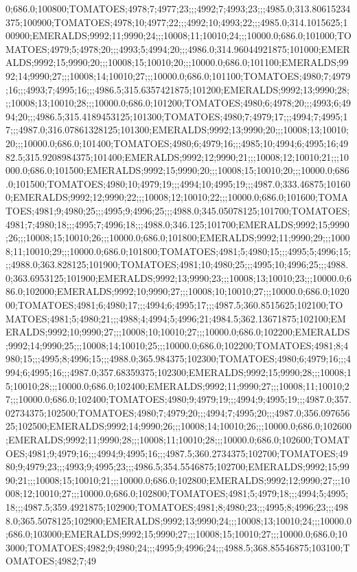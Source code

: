 0;686.0;100800;TOMATOES;4978;7;4977;23;;;4992;7;4993;23;;;4985.0;313.80615234375;100900;TOMATOES;4978;10;4977;22;;;4992;10;4993;22;;;4985.0;314.1015625;100900;EMERALDS;9992;11;9990;24;;;10008;11;10010;24;;;10000.0;686.0;101000;TOMATOES;4979;5;4978;20;;;4993;5;4994;20;;;4986.0;314.96044921875;101000;EMERALDS;9992;15;9990;20;;;10008;15;10010;20;;;10000.0;686.0;101100;EMERALDS;9992;14;9990;27;;;10008;14;10010;27;;;10000.0;686.0;101100;TOMATOES;4980;7;4979;16;;;4993;7;4995;16;;;4986.5;315.6357421875;101200;EMERALDS;9992;13;9990;28;;;10008;13;10010;28;;;10000.0;686.0;101200;TOMATOES;4980;6;4978;20;;;4993;6;4994;20;;;4986.5;315.4189453125;101300;TOMATOES;4980;7;4979;17;;;4994;7;4995;17;;;4987.0;316.07861328125;101300;EMERALDS;9992;13;9990;20;;;10008;13;10010;20;;;10000.0;686.0;101400;TOMATOES;4980;6;4979;16;;;4985;10;4994;6;4995;16;4982.5;315.9208984375;101400;EMERALDS;9992;12;9990;21;;;10008;12;10010;21;;;10000.0;686.0;101500;EMERALDS;9992;15;9990;20;;;10008;15;10010;20;;;10000.0;686.0;101500;TOMATOES;4980;10;4979;19;;;4994;10;4995;19;;;4987.0;333.46875;101600;EMERALDS;9992;12;9990;22;;;10008;12;10010;22;;;10000.0;686.0;101600;TOMATOES;4981;9;4980;25;;;4995;9;4996;25;;;4988.0;345.05078125;101700;TOMATOES;4981;7;4980;18;;;4995;7;4996;18;;;4988.0;346.125;101700;EMERALDS;9992;15;9990;26;;;10008;15;10010;26;;;10000.0;686.0;101800;EMERALDS;9992;11;9990;29;;;10008;11;10010;29;;;10000.0;686.0;101800;TOMATOES;4981;5;4980;15;;;4995;5;4996;15;;;4988.0;363.828125;101900;TOMATOES;4981;10;4980;25;;;4995;10;4996;25;;;4988.0;363.6953125;101900;EMERALDS;9992;13;9990;23;;;10008;13;10010;23;;;10000.0;686.0;102000;EMERALDS;9992;10;9990;27;;;10008;10;10010;27;;;10000.0;686.0;102000;TOMATOES;4981;6;4980;17;;;4994;6;4995;17;;;4987.5;360.8515625;102100;TOMATOES;4981;5;4980;21;;;4988;4;4994;5;4996;21;4984.5;362.13671875;102100;EMERALDS;9992;10;9990;27;;;10008;10;10010;27;;;10000.0;686.0;102200;EMERALDS;9992;14;9990;25;;;10008;14;10010;25;;;10000.0;686.0;102200;TOMATOES;4981;8;4980;15;;;4995;8;4996;15;;;4988.0;365.984375;102300;TOMATOES;4980;6;4979;16;;;4994;6;4995;16;;;4987.0;357.68359375;102300;EMERALDS;9992;15;9990;28;;;10008;15;10010;28;;;10000.0;686.0;102400;EMERALDS;9992;11;9990;27;;;10008;11;10010;27;;;10000.0;686.0;102400;TOMATOES;4980;9;4979;19;;;4994;9;4995;19;;;4987.0;357.02734375;102500;TOMATOES;4980;7;4979;20;;;4994;7;4995;20;;;4987.0;356.09765625;102500;EMERALDS;9992;14;9990;26;;;10008;14;10010;26;;;10000.0;686.0;102600;EMERALDS;9992;11;9990;28;;;10008;11;10010;28;;;10000.0;686.0;102600;TOMATOES;4981;9;4979;16;;;4994;9;4995;16;;;4987.5;360.2734375;102700;TOMATOES;4980;9;4979;23;;;4993;9;4995;23;;;4986.5;354.5546875;102700;EMERALDS;9992;15;9990;21;;;10008;15;10010;21;;;10000.0;686.0;102800;EMERALDS;9992;12;9990;27;;;10008;12;10010;27;;;10000.0;686.0;102800;TOMATOES;4981;5;4979;18;;;4994;5;4995;18;;;4987.5;359.4921875;102900;TOMATOES;4981;8;4980;23;;;4995;8;4996;23;;;4988.0;365.5078125;102900;EMERALDS;9992;13;9990;24;;;10008;13;10010;24;;;10000.0;686.0;103000;EMERALDS;9992;15;9990;27;;;10008;15;10010;27;;;10000.0;686.0;103000;TOMATOES;4982;9;4980;24;;;4995;9;4996;24;;;4988.5;368.85546875;103100;TOMATOES;4982;7;49